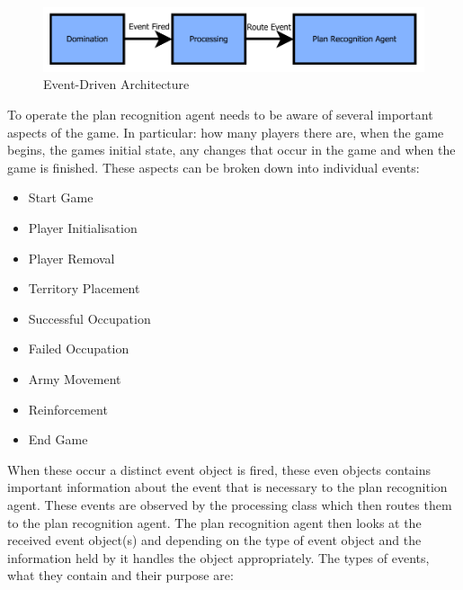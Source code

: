 \documentclass[parskip]{cs4rep}
\begin{document}
\begin{figure}[h]
\centerline{
\includegraphics{images/event-driven-architecture}
}
\caption{Event-Driven Architecture}
\end{figure} 

To operate the plan recognition agent needs to be aware of several important aspects of the game. In particular: how many players there are, when the game begins, the games initial state, any changes that occur in the game and when the game is finished. These aspects can be broken down into individual events:

\begin{itemize}
\item
Start Game
\item
Player Initialisation
\item
Player Removal
\item
Territory Placement
\item
Successful Occupation
\item
Failed Occupation
\item
Army Movement
\item
Reinforcement
\item
End Game
\end{itemize}

When these occur a distinct event object is fired, these even objects contains important information about the event that is necessary to the plan recognition agent. These events are observed by the processing class which then routes them to the plan recognition agent. The plan recognition agent then looks at the received event object(s) and depending on the type of event object and the information held by it handles the object appropriately. The types of events, what they contain and their purpose are:
\end{document}
